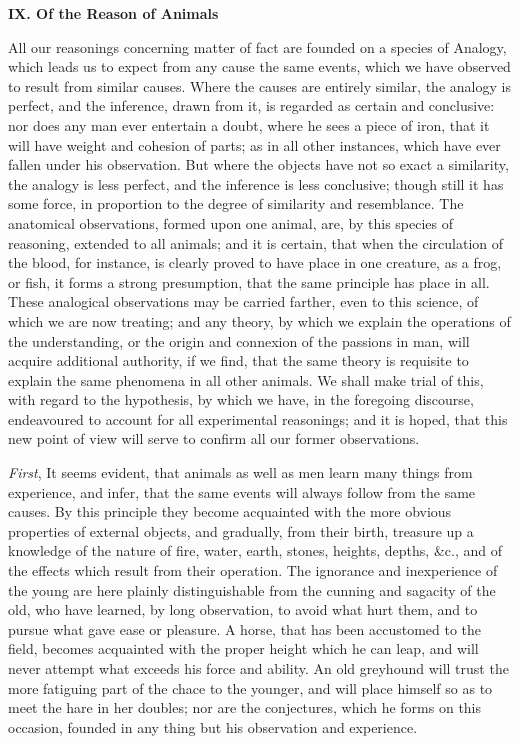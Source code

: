 \documentclass[]{article}
\newcommand*{\itemsection}[2]{\needspace{36pt}\begin{center}\addcontentsline{toc}{section}{#1. #2}\rfoot{\sc Hume's Enquiry #1}\textbf{\Large #1. #2}\nopagebreak\stepcounter{section}\end{center}}
\begin{document}
\itemsection{IX}{Of the Reason of Animals}

\begin{sectionbody}

\humeparagraph  All our reasonings concerning matter of fact are founded on a species of Analogy, which leads us to expect from any cause the same events, which we have observed to result from similar causes. Where the causes are entirely similar, the analogy is perfect, and the inference, drawn from it, is regarded as certain and conclusive: nor does any man ever entertain a doubt, where he sees a piece of iron, that it will have weight and cohesion of parts; as in all other instances, which have ever fallen under his observation. But where the objects have not so exact a similarity, the analogy is less perfect, and the inference is less conclusive; though still it has some force, in proportion to the degree of similarity and resemblance. The anatomical observations, formed upon one animal, are, by this species of reasoning, extended to all animals; and it is certain, that when the circulation of the blood, for instance, is clearly proved to have place in one creature, as a frog, or fish, it forms a strong presumption, that the same principle has place in all. These analogical observations may be carried farther, even to this science, of which we are now treating; and any theory, by which we explain the operations of the understanding, or the origin and connexion of the passions in man, will acquire additional authority, if we find, that the same theory is requisite to explain the same phenomena in all other animals. We shall make trial of this, with regard to the hypothesis, by which we have, in the foregoing discourse, endeavoured to account for all experimental reasonings; and it is hoped, that this new point of view will serve to confirm all our former observations.

\humeparagraph  \emph{First}, It seems evident, that animals as well as men learn many things from experience, and infer, that the same events will always follow from the same causes. By this principle they become acquainted with the more obvious properties of external objects, and gradually, from their birth, treasure up a knowledge of the nature of fire, water, earth, stones, heights, depths, \&c., and of the effects which result from their operation. The ignorance and inexperience of the young are here plainly distinguishable from the cunning and sagacity of the old, who have learned, by long observation, to avoid what hurt them, and to pursue what gave ease or pleasure. A horse, that has been accustomed to the field, becomes acquainted with the proper height which he can leap, and will never attempt what exceeds his force and ability. An old greyhound will trust the more fatiguing part of the chace to the younger, and will place himself so as to meet the hare in her doubles; nor are the conjectures, which he forms on this occasion, founded in any thing but his observation and experience.


\end{sectionbody}
\end{document}
